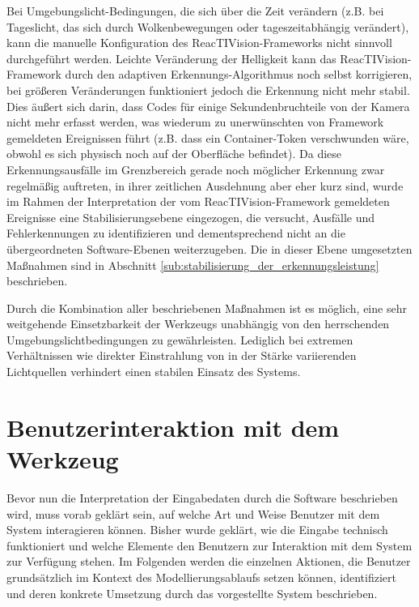 Bei Umgebungslicht-Bedingungen, die sich über die Zeit verändern (z.B. bei Tageslicht, das sich durch Wolkenbewegungen oder tageszeitabhängig verändert), kann die manuelle Konfiguration des ReacTIVision-Frameworks nicht sinnvoll durchgeführt werden. Leichte Veränderung der Helligkeit kann das ReacTIVision-Framework durch den adaptiven Erkennungs-Algorithmus noch selbst korrigieren, bei größeren Veränderungen funktioniert jedoch die Erkennung nicht mehr stabil. Dies äußert sich darin, dass Codes für einige Sekundenbruchteile von der Kamera nicht mehr erfasst werden, was wiederum zu unerwünschten von Framework gemeldeten Ereignissen führt (z.B. dass ein Container-Token verschwunden wäre, obwohl es sich physisch noch auf der Oberfläche befindet). Da diese Erkennungsausfälle im Grenzbereich gerade noch möglicher Erkennung zwar regelmäßig auftreten, in ihrer zeitlichen Ausdehnung aber eher kurz sind, wurde im Rahmen der Interpretation der vom ReacTIVision-Framework gemeldeten Ereignisse eine Stabilisierungsebene eingezogen, die versucht, Ausfälle und Fehlerkennungen zu identifizieren und dementsprechend nicht an die übergeordneten Software-Ebenen weiterzugeben. Die in dieser Ebene umgesetzten Maßnahmen sind in Abschnitt \ref{sub:stabilisierung_der_erkennungsleistung} beschrieben.

Durch die Kombination aller beschriebenen Maßnahmen ist es möglich, eine sehr weitgehende Einsetzbarkeit der Werkzeugs unabhängig von den herrschenden Umgebungslichtbedingungen zu gewährleisten. Lediglich bei extremen Verhältnissen wie direkter Einstrahlung von in der Stärke variierenden Lichtquellen verhindert einen stabilen Einsatz des Systems.  


\section{Benutzerinteraktion mit dem Werkzeug} %
\label{sec:benutzerinteraktion_mit_dem_werkzeug}

Bevor nun die Interpretation der Eingabedaten durch die Software beschrieben wird, muss vorab geklärt sein, auf welche Art und Weise Benutzer mit dem System interagieren können. Bisher wurde geklärt, wie die Eingabe technisch funktioniert und welche Elemente den Benutzern zur Interaktion mit dem System zur Verfügung stehen. Im Folgenden werden die einzelnen Aktionen, die Benutzer grundsätzlich im Kontext des Modellierungsablaufs setzen können, identifiziert und deren konkrete Umsetzung durch das vorgestellte System beschrieben.

